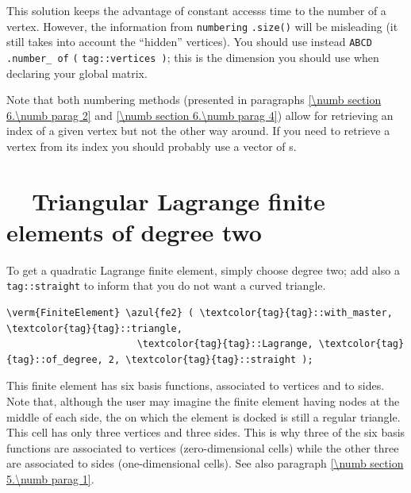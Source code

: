 This solution keeps the advantage of constant accesss time to the number of a vertex.
However, the information from {\small\tt numbering} {\small\tt .size()} will be misleading
(it still takes into account the ``hidden'' vertices).
You should use instead {\small\tt ABCD} {\small\tt .number\_\,of} {\small\tt (}
{\small\tt\textcolor{tag}{tag}::vertices )}; this is the dimension you should use
when declaring your global matrix.

Note that both numbering methods (presented in paragraphs \ref{\numb section 6.\numb parag 2}
and \ref{\numb section 6.\numb parag 4}) allow for retrieving
an index of a given vertex but not the other way around.
If you need to retrieve a vertex from its index you should probably use 
a vector of {\small\tt{}}s.


\section{~~Triangular Lagrange finite elements of degree two}\label{\numb section 6.\numb parag 5}

To get a quadratic Lagrange finite element, simply choose degree two; add also a 
{\small\tt\textcolor{tag}{tag}::straight} to inform {\maniFEM} that you do not want
a curved triangle.

\begin{Verbatim}[commandchars=\\\{\},formatcom=\small\tt,frame=single,
   label=parag-\ref{\numb section 6.\numb parag 5}.cpp,rulecolor=\color{moldura},
   baselinestretch=0.94,framesep=2mm                                            ]
   \verm{FiniteElement} \azul{fe2} ( \textcolor{tag}{tag}::with_master, \textcolor{tag}{tag}::triangle,
                       \textcolor{tag}{tag}::Lagrange, \textcolor{tag}{tag}::of_degree, 2, \textcolor{tag}{tag}::straight );
\end{Verbatim}

This finite element has six basis functions, associated to vertices and to sides.
Note that, although the user may imagine the finite element having nodes at the middle of
each side, the {\small\tt{}} on which the element is docked is still a regular triangle.
This cell has only three vertices and three sides.
This is why three of the six basis functions are associated to vertices (zero-dimensional cells)
while the other three are associated to sides (one-dimensional cells).
See also paragraph \ref{\numb section 5.\numb parag 1}.

